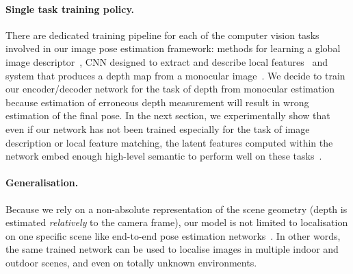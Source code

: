 \paragraph{Single task training policy.} There are dedicated training pipeline for each of the computer vision tasks involved in our image pose estimation framework: methods for learning a global image descriptor~\citep{Arandjelovic2017, Radenovic2017, Gordo2017}, CNN designed to extract and describe local features~\citep{Yi2016a, Rocco2018, Ono2018} and system that produces a depth map from a monocular image~\citep{Eigen2014, Godard2017, Mahjourian2018}. We decide to train our encoder/decoder network for the task of depth from monocular estimation because estimation of erroneous depth measurement will result in wrong estimation of the final pose. In the next section, we experimentally show that even if our network has not been trained especially for the task of image description or local feature matching, the latent features computed within the network embed enough high-level semantic to perform well on these tasks~\citep{Taira2018, Zamir2018}.
\paragraph{Generalisation.} Because we rely on a non-absolute representation of the scene geometry (depth is estimated \textit{relatively} to the camera frame), our model is not limited to localisation on one specific scene like end-to-end pose estimation networks~\citep{Kendall2017, Brachmann2017b}. In other words, the same trained network can be used to localise images in multiple indoor and outdoor scenes, and even on totally unknown environments. 
